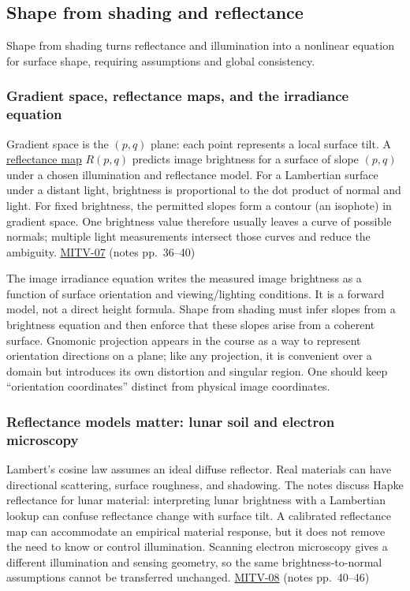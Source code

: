 \subsection{Shape from shading and reflectance}\label{shape-from-shading-and-reflectance}

Shape from shading turns reflectance and illumination into a nonlinear equation for surface shape, requiring assumptions and global consistency.

\subsubsection{Gradient space, reflectance maps, and the irradiance equation}\label{gradient-space-reflectance-maps-and-the-irradiance-equation}

Gradient space is the \((p,q)\) plane: each point represents a local surface tilt. A \hyperref[appendix-89b2d5b7c9e1]{reflectance map} \(R(p,q)\) predicts image brightness for a surface of slope \((p,q)\) under a chosen illumination and reflectance model. For a Lambertian surface under a distant light, brightness is proportional to the dot product of normal and light. For fixed brightness, the permitted slopes form a contour (an isophote) in gradient space. One brightness value therefore usually leaves a curve of possible normals; multiple light measurements intersect those curves and reduce the ambiguity. \hyperref[04-visual-computing-ii-ch036]{MITV-07} (notes pp.~36--40)

The image irradiance equation writes the measured image brightness as a function of surface orientation and viewing/lighting conditions. It is a forward model, not a direct height formula. Shape from shading must infer slopes from a brightness equation and then enforce that these slopes arise from a coherent surface. Gnomonic projection appears in the course as a way to represent orientation directions on a plane; like any projection, it is convenient over a domain but introduces its own distortion and singular region. One should keep ``orientation coordinates'' distinct from physical image coordinates.

\subsubsection{Reflectance models matter: lunar soil and electron microscopy}\label{reflectance-models-matter-lunar-soil-and-electron-microscopy}

Lambert's cosine law assumes an ideal diffuse reflector. Real materials can have directional scattering, surface roughness, and shadowing. The notes discuss Hapke reflectance for lunar material: interpreting lunar brightness with a Lambertian lookup can confuse reflectance change with surface tilt. A calibrated reflectance map can accommodate an empirical material response, but it does not remove the need to know or control illumination. Scanning electron microscopy gives a different illumination and sensing geometry, so the same brightness-to-normal assumptions cannot be transferred unchanged. \hyperref[04-visual-computing-ii-ch036]{MITV-08} (notes pp.~40--46)

